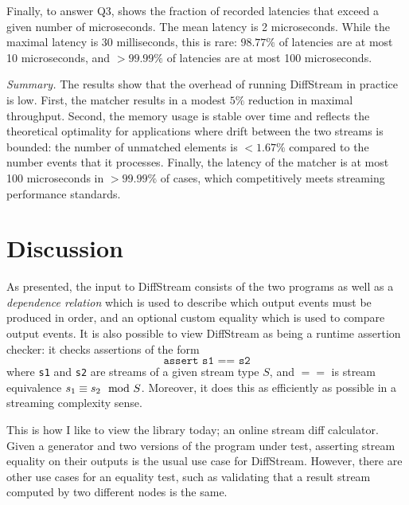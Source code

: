 Finally, to answer Q3,
 shows the fraction of recorded latencies
that exceed a given number of microseconds.
The mean latency is 2 microseconds.
While the maximal latency is 30 milliseconds, this is rare:
$98.77\%$ of latencies
are at most 10 microseconds, and $>99.99\%$ of latencies are at most
100 microseconds.

\emph{Summary.} The results show that the overhead of running DiffStream in practice is low.
First, the matcher results in a modest $5\%$ reduction in maximal throughput.
Second, the memory usage is stable over time and reflects the theoretical optimality for applications where drift between the two streams is bounded:
the number of unmatched elements is $<1.67\%$ compared to the number events that it processes.
Finally, the latency of the matcher is at most 100 microseconds in $>99.99\%$ of cases, which competitively meets streaming performance standards.

\section{Discussion}
\label{diffstream:sec:conclusion}

As presented, the input to DiffStream consists of the two programs as well as
a \emph{dependence relation} which is used to describe which output
events must be produced in order, and an optional custom equality
which is used to compare output events.
It is also possible to view DiffStream as being a runtime assertion checker: it checks assertions of the form
\[
\texttt{assert s1 == s2}
\]
where \texttt{s1} and \texttt{s2} are streams of a given stream type $S$, and $==$ is stream equivalence $s_1 \equiv s_2 \mod {S}$. Moreover, it does this as efficiently as possible in a streaming complexity sense.

This is how I like to view the library today; an online stream diff calculator. Given a generator and two versions of the program under test, asserting stream equality on their outputs is the usual use case for DiffStream. However, there are other use cases for an equality test, such as validating that a result stream computed by two different nodes is the same.

